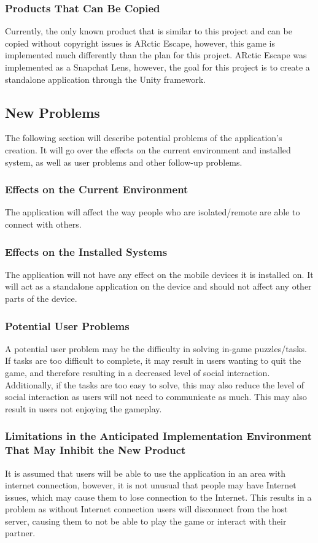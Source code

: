 \documentclass[12pt]{article}
\begin{document}
\subsubsection{Products That Can Be Copied}
Currently, the only known product that is similar to this project and can be copied without copyright issues is ARctic Escape, however, this game is implemented much differently than the plan for this project. ARctic Escape was implemented as a Snapchat Lens, however, the goal for this project is to create a standalone application through the Unity framework.

\subsection{New Problems}
The following section will describe potential problems of the application's creation. It will go over the effects on the current environment and installed system, as well as user problems and other follow-up problems.

\subsubsection{Effects on the Current Environment}
The application will affect the way people who are isolated/remote are able to connect with others.

\subsubsection{Effects on the Installed Systems}
The application will not have any effect on the mobile devices it is installed on. It will act as a standalone application on the device and should not affect any other parts of the device.

\subsubsection{Potential User Problems}
A potential user problem may be the difficulty in solving in-game puzzles/tasks. If tasks are too difficult to complete, it may result in users wanting to quit the game, and therefore resulting in a decreased level of social interaction. Additionally, if the tasks are too easy to solve, this may also reduce the level of social interaction as users will not need to communicate as much. This may also result in users not enjoying the gameplay.

\subsubsection{Limitations in the Anticipated Implementation Environment That May Inhibit the New Product}
It is assumed that users will be able to use the application in an area with internet connection, however, it is not unusual that people may have Internet issues, which may cause them to lose connection to the Internet. This results in a problem as without Internet connection users will disconnect from the host server, causing them to not be able to play the game or interact with their partner.
\end{document}
